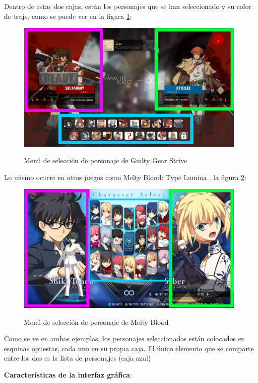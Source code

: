 Dentro de estas dos cajas, están los personajes que se han seleccionado y su color de traje, como se puede ver en la figura \ref{fig: strive chracter select}:

\begin{figure}[ht!]
    \centering
    \caption{Menú de selección de personaje de Guilty Gear Strive}
    \includegraphics[height=0.5\textwidth]{figures/guilty.jpg}
    \label{fig: strive chracter select}
\end{figure}

Lo mismo ocurre en otros juegos como Melty Blood: Type Lumina \cite{noauthor_melty_nodate}, la figura \ref{fig: melty character select}:

\begin{figure}[ht!]
    \centering
    \caption{Menú de selección de personaje de Melty Blood}
    \includegraphics[height=0.5\textwidth]{figures/melty.jpg}
    \label{fig: melty character select}
\end{figure}

Como se ve en ambos ejemplos, los personajes seleccionados están colocados en esquinas opuestas, cada uno en su propia caja. El único elemento que se comparte entre los dos es la lista de personajes (caja azul)

\textbf{Características de la interfaz gráfica}: 

